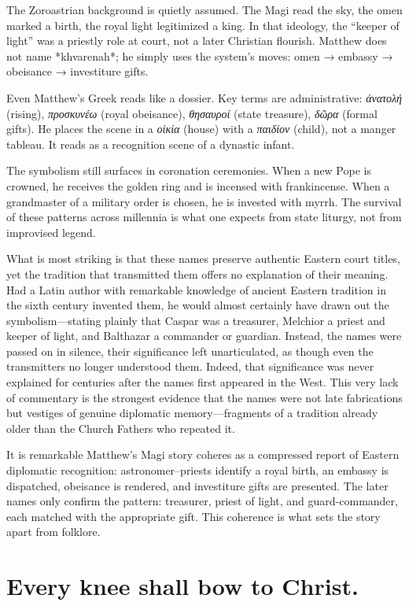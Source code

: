 The Zoroastrian background is quietly assumed.
The Magi read the sky, the omen marked a birth, the royal light legitimized a king.
In that ideology, the “keeper of light” was a priestly role at court, not a later Christian flourish.
Matthew does not name *khvarenah*; he simply uses the system’s moves: omen → embassy → obeisance → investiture gifts.

Even Matthew’s Greek reads like a dossier.
Key terms are administrative: \textit{ἀνατολή} (rising), \textit{προσκυνέω} (royal obeisance), \textit{θησαυροί} (state treasure), \textit{δῶρα} (formal gifts).
He places the scene in a \textit{οἰκία} (house) with a \textit{παιδίον} (child), not a manger tableau.
It reads as a recognition scene of a dynastic infant.

The symbolism still surfaces in coronation ceremonies.
When a new Pope is crowned, he receives the golden ring and is incensed with frankincense.
When a grandmaster of a military order is chosen, he is invested with myrrh.
The survival of these patterns across millennia is what one expects from state liturgy, not from improvised legend.

What is most striking is that these names preserve authentic Eastern court titles, yet the tradition that transmitted them offers no explanation of their meaning.
Had a Latin author with remarkable knowledge of ancient Eastern tradition in the sixth century invented them, he would almost certainly have drawn out the symbolism—stating plainly that Caspar was a treasurer, Melchior a priest and keeper of light, and Balthazar a commander or guardian.
Instead, the names were passed on in silence, their significance left unarticulated, as though even the transmitters no longer understood them.
Indeed, that significance was never explained for centuries after the names first appeared in the West.
This very lack of commentary is the strongest evidence that the names were not late fabrications but vestiges of genuine diplomatic memory—fragments of a tradition already older than the Church Fathers who repeated it.

It is remarkable Matthew’s Magi story coheres as a compressed report of Eastern diplomatic recognition: astronomer–priests identify a royal birth, an embassy is dispatched, obeisance is rendered, and investiture gifts are presented.
The later names only confirm the pattern: treasurer, priest of light, and guard-commander, each matched with the appropriate gift.
This coherence is what sets the story apart from folklore.

\section{Every knee shall bow to Christ.}\label{sec:every-knee-shall-bow-to-christ.}

